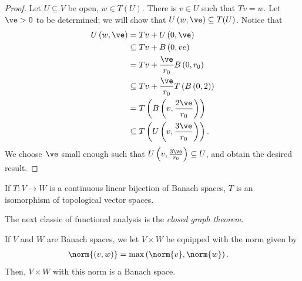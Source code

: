 \documentclass[10pt]{mypackage}
\begin{document}
\begin{proof}
  Let $U\subseteq V$ be open, $w\in T(U)$. There is $v\in U$ such that $Tv = w$. Let $\ve > 0$ to be determined; we will show that $U\left( w,\ve \right)\subseteq T(U)$. Notice that
  \begin{align*}
    U\left( w,\ve \right) &= Tv + U\left( 0,\ve \right)\\
                          &\subseteq Tv + B\left( 0,ve \right)\\
                          &= Tv + \frac{\ve}{r_0}B\left( 0,r_0 \right)\\
                          &\subseteq Tv + \frac{\ve}{r_0}T\left( B\left( 0,2 \right) \right)\\
                          &= T\left( B\left( v,\frac{2\ve}{r_0} \right) \right)\\
                          &\subseteq T\left( U\left( v,\frac{3\ve}{r_0} \right) \right).
  \end{align*}
  We choose $\ve$ small enough such that $U\left( v,\frac{3\ve}{r_0} \right)\subseteq U$, and obtain the desired result.
\end{proof}
\begin{corollary}
  If $T\colon V\to W$ is a continuous linear bijection of Banach spaces, $T$ is an isomorphism of topological vector spaces.
\end{corollary}
The next classic of functional analysis is the \textit{closed graph theorem}.

If $V$ and $W$ are Banach spaces, we let $V \times W$ be equipped with the norm given by
\begin{align*}
  \norm{\left( v,w \right)} &= \max\left( \norm{v},\norm{w} \right).
\end{align*}
Then, $V\times W$ with this norm is a Banach space.
\end{document}
